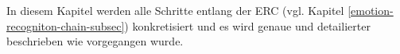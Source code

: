 

In diesem Kapitel werden alle Schritte entlang der ERC (vgl. Kapitel \ref{emotion-recogniton-chain-subsec}) konkretisiert und es wird genaue und detailierter beschrieben wie vorgegangen wurde. \\










